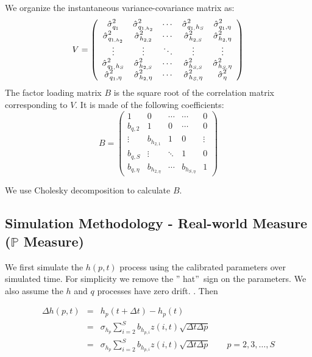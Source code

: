 \documentclass{article}
\begin{document}
We organize the instantaneous variance-covariance matrix as:%
\begin{equation*}
V=\left( 
\begin{array}{ccccc}
\hat{\sigma}_{q_{1}}^{2} & \hat{\sigma}_{q_{1,h_{2}}}^{2} & \cdots & \hat{%
\sigma}_{q_{1,}h_{S}}^{2} & \hat{\sigma}_{q_{1},\eta }^{2} \\ 
\hat{\sigma}_{q_{1,h_{2}}}^{2} & \hat{\sigma}_{h_{2,2}}^{2} & \cdots & \hat{%
\sigma}_{h_{2,S}}^{2} & \hat{\sigma}_{h_{2,}\eta }^{2} \\ 
\vdots & \vdots & \ddots & \vdots & \vdots \\ 
\hat{\sigma}_{q_{1,}h_{S}}^{2} & \hat{\sigma}_{h_{2,S}}^{2} & \cdots & \hat{%
\sigma}_{h_{S,S}}^{2} & \hat{\sigma}_{h_{S,}\eta }^{2} \\ 
\hat{\sigma}_{q_{1},\eta }^{2} & \hat{\sigma}_{h_{2,}\eta }^{2} & \cdots & 
\hat{\sigma}_{h_{S,}\eta }^{2} & \hat{\sigma}_{\eta }^{2}%
\end{array}%
\right)
\end{equation*}%
The factor loading matrix $B$ is the square root of the correlation matrix
corresponding to $V$. It is made of the following coefficients:%
\begin{equation*}
B=\left( 
\begin{array}{ccccc}
1 & 0 & \cdots & \cdots & 0 \\ 
b_{q,2} & 1 & 0 & \cdots & 0 \\ 
\vdots & b_{h_{2,1}} & 1 & 0 & \vdots \\ 
b_{q,S} & \vdots & \ddots & 1 & 0 \\ 
b_{q,\eta } & b_{h_{2,\eta }} & \cdots & b_{h_{S,\eta }} & 1%
\end{array}%
\right)
\end{equation*}

We use Cholesky decomposition to calculate $B.$

\subsection{Simulation Methodology - Real-world Measure ($\mathbb{P}$
Measure)}

We first simulate the $h(p,t)$ process using the calibrated parameters over
simulated time. For simplicity we remove the \textquotedblright
hat\textquotedblright\ sign on the parameters. We also assume the $h$ and $q$
processes have zero drift. . Then

\begin{eqnarray*}
\Delta h(p,t) &=& h_p(t+\Delta t) - h_p(t) \\
&=& \sigma_{h_p} \sum_{i=2}^{S} b_{h_{p, i}} z(i,t) \sqrt{\Delta t \Delta p}
\\
&=& \sigma_{h_p} \sum_{i=2}^{S} b_{h_{p, i}} z(i,t) \sqrt{\Delta t \Delta p}
\qquad p = 2, 3, \ldots, S
\end{eqnarray*}
\end{document}
